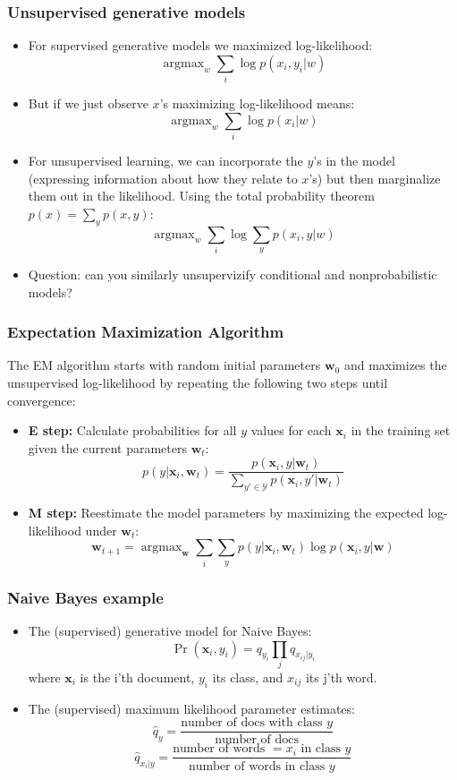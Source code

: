 \documentclass[ignorenonframetext,plain,fleqn]{beamer}
\DeclareMathOperator*{\argmax}{argmax}
\renewcommand{\vec}{\mathbf}
\begin{document}
\begin{frame}\frametitle{Unsupervised generative models}
\begin{itemize}
\item For supervised generative models we maximized log-likelihood: \[
  \argmax_w \sum_i \log p(x_i, y_i|w)
\]
\item But if we just observe $x$'s maximizing log-likelihood means: \[
  \argmax_w \sum_i \log p(x_i|w)
\]
\item For unsupervised learning, we can incorporate the $y$'s in the
  model (expressing information about how they relate to $x$'s) but
  then marginalize them out in the likelihood.  Using the total
  probability theorem $p(x) = \sum_y p(x, y)$:
\[ 
\argmax_w \sum_i \log \sum_y p(x_i, y|w)
\]
\item Question: can you similarly unsupervizify conditional and
  nonprobabilistic models?
\end{itemize}
\end{frame}

\begin{frame}\frametitle{Expectation Maximization Algorithm}
The EM algorithm starts with random initial parameters $\vec{w}_0$ and
maximizes the unsupervised log-likelihood by repeating the following
two steps until convergence:
\begin{itemize}
\item {\bf E step:} Calculate probabilities for all $y$ values for
  each $\vec{x}_i$ in the training set given the current parameters
  $\vec{w}_t$:
\[
  p(y|\vec{x}_i,\vec{w}_t) = \frac{p(\vec{x}_i, y|\vec{w}_t)}
  {\sum_{y'\in\mathcal{Y}} p(\vec{x}_i, y'|\vec{w}_t)}
\]
\item {\bf M step:} Reestimate the model parameters by maximizing the
  expected log-likelihood under $\vec{w}_t$:
\[
\vec{w}_{t+1} = \argmax_\vec{w} \sum_i \sum_y p(y|\vec{x}_i,\vec{w}_t)
\log p(\vec{x}_i, y | \vec{w})
\]
\end{itemize}
\end{frame}

\begin{frame}\frametitle{Naive Bayes example}
\begin{itemize}
\item The (supervised) generative model for Naive Bayes:  
\[
  \Pr(\vec{x}_i,y_i) = q_{y_i} \prod_j q_{x_{ij}|y_i}
\]
where $\vec{x}_i$ is the i'th document, $y_i$ its class, and $x_{ij}$
its j'th word.
\item The (supervised) maximum likelihood parameter estimates: 
\[
\hat{q}_y = 
\frac{\text{number of docs with class $y$}}
{\text{number of docs}}
\]
\[
\hat{q}_{x_i|y} = 
\frac{\text{number of words $=x_i$ in class $y$}}
{\text{number of words in class $y$}}
\]
\end{itemize}
\end{frame}
\end{document}
